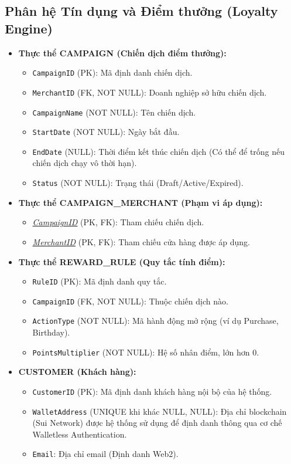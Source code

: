 \subsection{Phân hệ Tín dụng và Điểm thưởng (Loyalty Engine)}
\begin{itemize}
    \item \textbf{Thực thể CAMPAIGN (Chiến dịch điểm thưởng):}
    \begin{itemize}
        \item \texttt{CampaignID} (PK): Mã định danh chiến dịch.
        \item \texttt{MerchantID} (FK, NOT NULL): Doanh nghiệp sở hữu chiến dịch.
        \item \texttt{CampaignName} (NOT NULL): Tên chiến dịch.
        \item \texttt{StartDate} (NOT NULL): Ngày bắt đầu.
        \item \texttt{EndDate} (NULL): Thời điểm kết thúc chiến dịch (Có thể để trống nếu chiến dịch chạy vô thời hạn).
        \item \texttt{Status} (NOT NULL): Trạng thái (Draft/Active/Expired).
    \end{itemize}

    \item \textbf{Thực thể CAMPAIGN\_MERCHANT (Phạm vi áp dụng):}
    \begin{itemize}
        \item \underline{\textit{CampaignID}} (PK, FK): Tham chiếu chiến dịch.
        \item \underline{\textit{MerchantID}} (PK, FK): Tham chiếu cửa hàng được áp dụng.
    \end{itemize}

    \item \textbf{Thực thể REWARD\_RULE (Quy tắc tính điểm):}
    \begin{itemize}
        \item \texttt{RuleID} (PK): Mã định danh quy tắc.
        \item \texttt{CampaignID} (FK, NOT NULL): Thuộc chiến dịch nào.
        \item \texttt{ActionType} (NOT NULL): Mã hành động mở rộng (ví dụ Purchase, Birthday).
        \item \texttt{PointsMultiplier} (NOT NULL): Hệ số nhân điểm, lớn hơn 0.
    \end{itemize}
    
    \item \textbf{CUSTOMER (Khách hàng):}
    \begin{itemize}
    \item \texttt{CustomerID} (PK): Mã định danh khách hàng nội bộ của hệ thống.
    \item \texttt{WalletAddress} (UNIQUE khi khác NULL, NULL): Địa chỉ blockchain (Sui Network) được hệ thống sử dụng để định danh thông qua cơ chế Walletless Authentication.
    \item \texttt{Email}: Địa chỉ email (Định danh Web2).
    \end{itemize}


\end{itemize}
